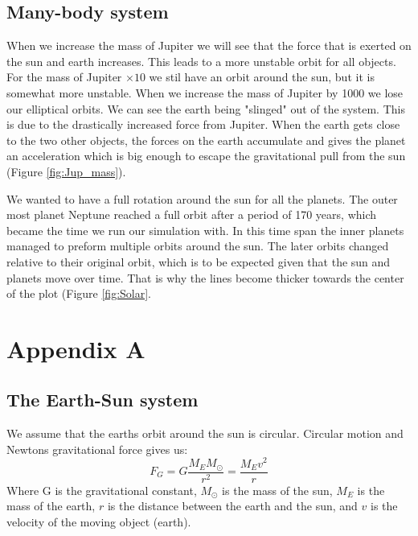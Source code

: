 \documentclass{article}
\begin{document}
\begin{multicols}{2}
\subsection{Many-body system}

When we increase the mass of Jupiter we will see that the force that is exerted on the sun and earth increases. This leads to a more unstable orbit for all objects. For the mass of Jupiter $\times 10$ we stil have an orbit around the sun, but it is somewhat more unstable. When we increase the mass of Jupiter by 1000 we lose our elliptical orbits. We can see the earth being "slinged" out of the system. This is due to the drastically increased force from Jupiter. When the earth gets close to the two other objects, the forces on the earth accumulate and gives the planet an acceleration which is big enough to escape the gravitational pull from the sun (Figure \ref{fig:Jup_mass}). 

We wanted to have a full rotation around the sun for all the planets. The outer most planet Neptune reached a full orbit after a period of 170 years, which became the time we run our simulation with. In this time span the inner planets managed to preform multiple orbits around the sun. The later orbits changed relative to their original orbit, which is to be expected given that the sun and planets move over time. That is why the lines become thicker towards the center of the plot (Figure \ref{fig:Solar}. 

\end{multicols}

\clearpage

\appendix \section{Appendix A} %
\subsection{The Earth-Sun system}
We assume that the earths orbit around the sun is circular. Circular motion and Newtons gravitational force gives us:
\begin{equation}
    F_G=G\frac{M_EM_{\odot}}{r^2}=\frac{M_Ev^2}{r}
    \label{eq:G}
\end{equation}
Where G is the gravitational constant, $M_\odot$ is the mass of the sun, $M_E$ is the mass of the earth, $r$ is the distance between the earth and the sun, and $v$ is the velocity of the moving object (earth). 
\end{document}
